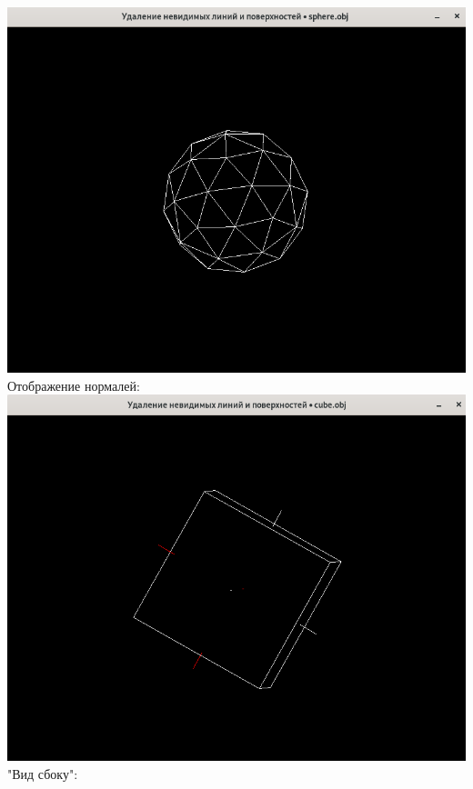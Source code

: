 \documentclass[a4paper,12pt]{article}
\begin{document}
\begin{flushleft}
  \includegraphics[scale=1.5]{sphere.png}\linebreak\linebreak
  Отображение нормалей:\linebreak
  \includegraphics[scale=1.5]{normals_cube.png}\linebreak\linebreak
  "Вид сбоку":\linebreak

\end{flushleft}
\end{document}
